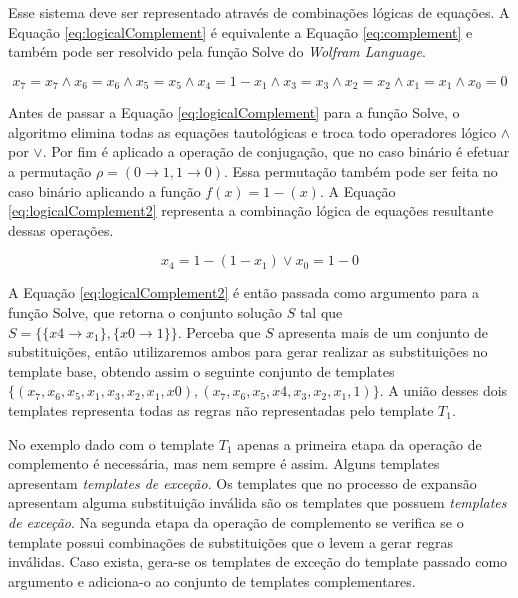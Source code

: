 \documentclass[12pt,a4paper]{article}
\begin{document}
	Esse sistema deve ser representado através de combinações lógicas de equações. A Equação \ref{eq:logicalComplement} é equivalente a Equação \ref{eq:complement} e também pode ser resolvido pela função Solve do \textit{Wolfram Language}.

	\begin{equation}
	x_7 = x_7	\wedge  
	x_6 = x_6	\wedge  
	x_5 = x_5	\wedge  
	x_4 = 1 - x_1 \wedge  
	x_3 = x_3	\wedge  
	x_2 = x_2	\wedge  
	x_1 = x_1	\wedge  
	x_0 = 0
	\label{eq:logicalComplement}
	\end{equation}

	Antes de passar a Equação \ref{eq:logicalComplement} para a função Solve, o algoritmo elimina todas as equações tautológicas e troca todo operadores lógico $\wedge$ por $\vee$. Por fim é aplicado a operação de conjugação, que no caso binário é efetuar a permutação $\rho = (0 \rightarrow 1, 1 \rightarrow 0)$. Essa permutação também pode ser feita no caso binário aplicando a função $f(x) = 1 - (x)$. A Equação \ref{eq:logicalComplement2} representa a combinação lógica de equações resultante dessas operações.

	\begin{equation}
	x_4 = 1 - (1 - x_1) \vee  
	x_0 = 1 - 0
	\label{eq:logicalComplement2}
	\end{equation}

	A Equação \ref{eq:logicalComplement2} é então passada como argumento para a função Solve, que retorna o conjunto solução $S$ tal que $S = \{\{x4 \to x_1\},\{x0\to 1\}\}$. Perceba que $S$ apresenta mais de um conjunto de substituições, então utilizaremos ambos para gerar realizar as substituições no template base, obtendo assim o seguinte conjunto de templates $\{(x_7,x_6,x_5,x_1,x_3,x_2,x_1,x0),(x_7,x_6,x_5,x4,x_3,x_2,x_1,1)\}$. A união desses dois templates representa todas as regras não representadas pelo template $T_1$.

	No exemplo dado com o template $T_1$ apenas a primeira etapa da operação de complemento é necessária, mas nem sempre é assim. Alguns templates apresentam \textit{templates de exceção}. Os templates que no processo de expansão apresentam alguma substituição inválida são os templates que possuem \textit{templates de exceção}. Na segunda etapa da operação de complemento se verifica se o template possui combinações de substituições que o levem a gerar regras inválidas. Caso exista, gera-se os templates de exceção do template passado como argumento e adiciona-o ao conjunto de templates complementares.
\end{document}
